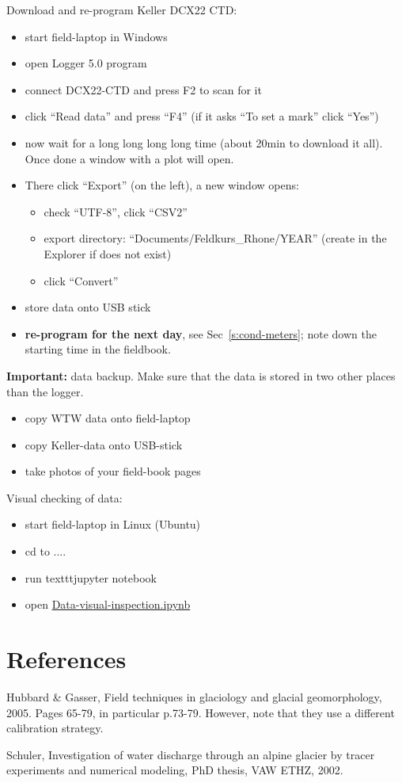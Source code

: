 \documentclass[DIV=15,halfparskip,11pt,headinclude]{scrartcl}
\begin{document}
Download and re-program Keller DCX22 CTD:
\begin{itemize}
\item start field-laptop in Windows
\item open Logger 5.0 program
\item connect DCX22-CTD and press F2 to scan for it
\item click ``Read data'' and press ``F4''
  (if it asks ``To set a mark'' click ``Yes'')
\item now wait for a long long long long time (about 20min to
  download it all).  Once done a window with a plot will open.
\item There click ``Export'' (on the left), a new window opens:
  \begin{itemize}
  \item check ``UTF-8'', click ``CSV2''
  \item export directory: ``Documents/Feldkurs\_Rhone/YEAR'' (create
    in the Explorer if does not exist)
  \item click ``Convert''
  \end{itemize}
\item store data onto USB stick
\item \textbf{re-program for the next day}, see Sec~\ref{s:cond-meters}; note
  down the starting time in the fieldbook.
\end{itemize}

\textbf{Important:} data backup.  Make sure that the data is
stored in two other places than the logger.
\begin{itemize}
\item copy WTW data onto field-laptop
\item copy Keller-data onto USB-stick
\item take photos of your field-book pages
\end{itemize}

Visual checking of data:
\begin{itemize}
\item start field-laptop in Linux (Ubuntu)
\item cd to ....
\item run texttt{jupyter notebook}
\item open \url{Data-visual-inspection.ipynb}
\end{itemize}



\section{References}

Hubbard \& Gasser, Field techniques in glaciology and glacial
geomorphology, 2005.  Pages 65-79, in particular p.73-79.  However,
note that they use a different calibration strategy.

Schuler, Investigation of water discharge through an alpine glacier by
tracer experiments and numerical modeling, PhD thesis, VAW ETHZ, 2002.
\end{document}
